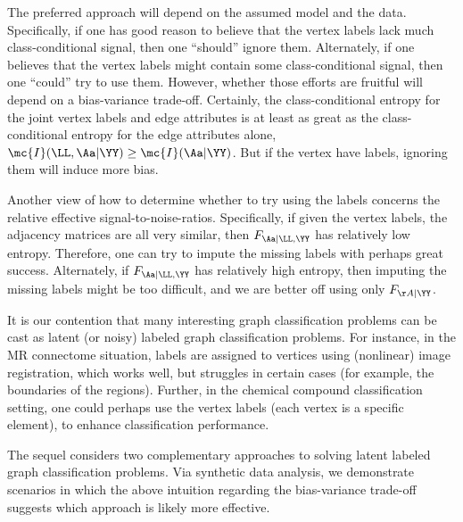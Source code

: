 \documentclass[10pt,journal,cspaper,compsoc]{IEEEtran}
\begin{document}
The preferred approach will depend on the assumed model and the data.  Specifically, if one has good reason to believe that the vertex labels lack much class-conditional signal, then one ``should'' ignore them.  Alternately, if one believes that the vertex labels might contain some class-conditional signal, then one ``could'' try to use them.  However, whether those efforts are fruitful will depend on a bias-variance trade-off.  Certainly, the class-conditional entropy for the joint vertex labels and edge attributes is at least as great as the class-conditional entropy for the edge attributes alone, $\mc{I}(\LL,\Aa | \YY) \geq \mc{I}(\Aa | \YY)$.   But if the vertex have labels, ignoring them will induce more bias.  

Another view of how to determine whether to try using the labels concerns the relative effective signal-to-noise-ratios.  Specifically, if given the vertex labels, the adjacency matrices are all very similar, then $F_{\Aa | \LL, \YY}$ has relatively low entropy.  Therefore, one can try to impute the missing labels with perhaps great success.  Alternately, if $F_{\Aa | \LL, \YY}$ has relatively high entropy, then imputing the missing labels might be too difficult, and we are better off using only $F_{\AA | \YY}$.

It is our contention that many interesting graph classification problems can be cast as latent (or noisy) labeled graph classification problems.  For instance, in the MR connectome situation, labels are assigned to vertices using (nonlinear) image registration, which works well, but struggles in certain cases (for example, the boundaries of the regions).  Further, in the chemical compound classification setting, one could perhaps use the vertex labels (each vertex is a specific element), to enhance classification performance.  

The sequel considers two complementary approaches to solving latent labeled graph classification problems. Via synthetic data analysis, we demonstrate scenarios in which the above intuition regarding the bias-variance trade-off suggests which approach is likely more effective.


\end{document}
